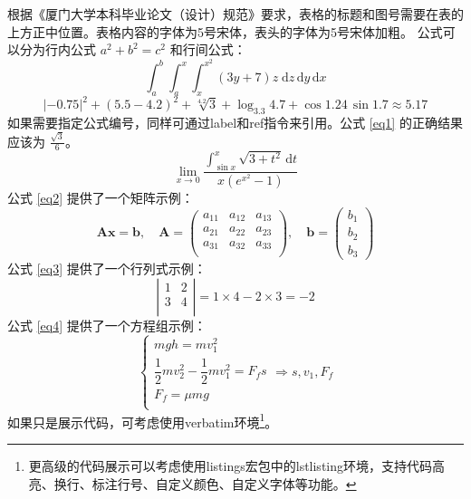 \documentclass{xmu}
\begin{document}
根据《厦门大学本科毕业论文（设计）规范》\cite{xmuthesis}要求，表格的标题和图号需要在表的上方正中位置。表格内容的字体为5号宋体，表头的字体为5号宋体加粗。
公式可以分为行内公式 $a^2+b^2=c^2$ 和行间公式：
$$
    \int_a^b\int_a^x\int_x^{x^2}(3y+7)z\;\mathrm{d}z\,\mathrm{d}y\,\mathrm{d}x
$$
$$
    |-0.75|^{2}+(5.5-4.2)^2+\sqrt[4.2]{3}+\log_{3.3}{4.7}+\cos1.24\,\sin1.7\approx5.17
$$
如果需要指定公式编号，同样可通过label和ref指令来引用。公式 \ref{eq1} 的正确结果应该为 $\frac{\sqrt{3}}{6}$。
\begin{equation}\label{eq1}
    \lim_{x\to0}\frac{\displaystyle{\int_{\sin x}^x\sqrt{3+t^2}\,\mathrm{d}t}}{x(e^{x^2}-1)}
\end{equation}
公式 \ref{eq2} 提供了一个矩阵示例：
\begin{equation}\label{eq2}
    \boldsymbol{Ax} = \boldsymbol{b},\quad\boldsymbol{A} = \left(\begin{array}{ccc}
            a_{11} & a_{12} & a_{13} \\
            a_{21} & a_{22} & a_{23} \\
            a_{31} & a_{32} & a_{33} \\
        \end{array}\right),\quad \boldsymbol{b}=\left(\begin{array}{c}
            b_1 \\ b_2 \\ b_3\end{array}\right)
\end{equation}
公式 \ref{eq3} 提供了一个行列式示例：
\begin{equation}\label{eq3}
    \left|\begin{array}{cc}
        1 & 2 \\
        3 & 4 \\
    \end{array}\right|=1\times4-2\times3=-2
\end{equation}
公式 \ref{eq4} 提供了一个方程组示例：
\begin{equation}\label{eq4}
    \begin{cases}
        mgh=mv_1^2                         \\
        \dfrac12mv_2^2-\dfrac12mv_1^2=F_fs \\
        F_f=\mu mg                         \\
    \end{cases} \Rightarrow s,v_1,F_f
\end{equation}
如果只是展示代码，可考虑使用verbatim环境\footnote{更高级的代码展示可以考虑使用listings宏包中的lstlisting环境，支持代码高亮、换行、标注行号、自定义颜色、自定义字体等功能。}。
\end{document}
